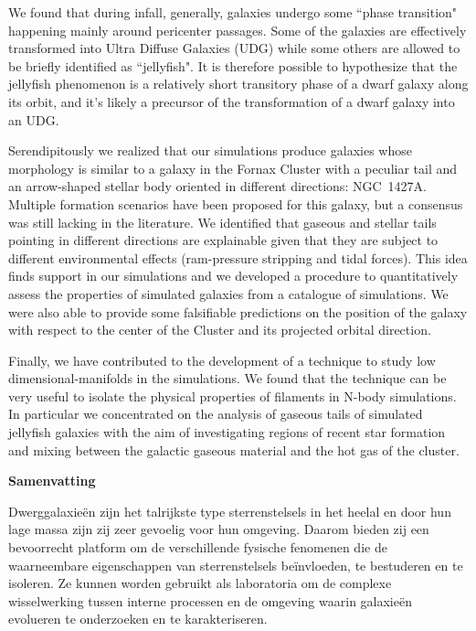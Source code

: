 We found that during infall, generally, galaxies undergo some ``phase transition" happening mainly around pericenter passages.
Some of the galaxies are effectively transformed into Ultra Diffuse Galaxies (UDG) while some others are allowed to be briefly identified as ``jellyfish".
It is therefore possible to hypothesize that the jellyfish phenomenon is a relatively short transitory phase of a dwarf galaxy along its orbit, and it's likely a precursor of the transformation of a dwarf galaxy into an UDG.

Serendipitously we realized that our simulations produce galaxies whose morphology is similar to a galaxy in the Fornax Cluster with a peculiar  \Hi{} tail and an arrow-shaped stellar body oriented in different directions: NGC~1427A.
Multiple formation scenarios have been proposed for this galaxy, but a consensus was still lacking in the literature.
We identified that gaseous and stellar tails pointing in different directions are explainable given that they are subject to different environmental effects (ram-pressure stripping and tidal forces). This idea finds support in our simulations and we developed a procedure to quantitatively assess the properties of simulated galaxies from a catalogue of simulations.
We were also able to provide some falsifiable predictions on the position of the galaxy with respect to the center of the Cluster and its projected orbital direction.

Finally, we have contributed to the development of a technique to study low dimensional-manifolds in the simulations.
We found that the technique can be very useful to isolate the physical properties of filaments in N-body simulations.
In particular we concentrated on the analysis of gaseous tails of simulated jellyfish galaxies with the aim of investigating regions of recent star formation and mixing between the galactic gaseous material and the hot gas of the cluster.


\clearpage
\thispagestyle{empty}
\null%
\begin{center}
  {\Large \textbf{Samenvatting}}\\
\end{center}

Dwerggalaxieën zijn het talrijkste type sterrenstelsels in het heelal en door hun lage massa zijn zij zeer gevoelig voor hun omgeving.
Daarom bieden zij een bevoorrecht platform om de verschillende fysische fenomenen die de waarneembare eigenschappen van sterrenstelsels beïnvloeden, te bestuderen en te isoleren.
Ze kunnen worden gebruikt als laboratoria om de complexe wisselwerking tussen interne processen en de omgeving waarin galaxieën evolueren te onderzoeken en te karakteriseren.

